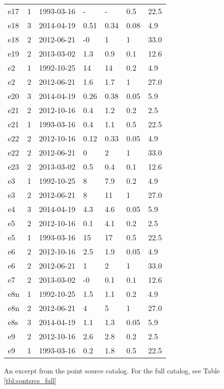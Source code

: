 \begin{table*}[htp]
\begin{tabular}{llll}
e17 & 1 & 1993-03-16 & - & - & 0.5 & 22.5 \\
e18 & 3 & 2014-04-19 & 0.51 & 0.34 & 0.08 & 4.9 \\
e18 & 2 & 2012-06-21 & -0 & 1 & 1 & 33.0 \\
e19 & 2 & 2013-03-02 & 1.3 & 0.9 & 0.1 & 12.6 \\
e2 & 1 & 1992-10-25 & 14 & 14 & 0.2 & 4.9 \\
e2 & 2 & 2012-06-21 & 1.6 & 1.7 & 1 & 27.0 \\
e20 & 3 & 2014-04-19 & 0.26 & 0.38 & 0.05 & 5.9 \\
e21 & 2 & 2012-10-16 & 0.4 & 1.2 & 0.2 & 2.5 \\
e21 & 1 & 1993-03-16 & 0.4 & 1.1 & 0.5 & 22.5 \\
e22 & 2 & 2012-10-16 & 0.12 & 0.33 & 0.05 & 4.9 \\
e22 & 2 & 2012-06-21 & 0 & 2 & 1 & 33.0 \\
e23 & 2 & 2013-03-02 & 0.5 & 0.4 & 0.1 & 12.6 \\
e3 & 1 & 1992-10-25 & 8 & 7.9 & 0.2 & 4.9 \\
e3 & 2 & 2012-06-21 & 8 & 11 & 1 & 27.0 \\
e4 & 3 & 2014-04-19 & 4.3 & 4.6 & 0.05 & 5.9 \\
e5 & 2 & 2012-10-16 & 0.1 & 4.1 & 0.2 & 2.5 \\
e5 & 1 & 1993-03-16 & 15 & 17 & 0.5 & 22.5 \\
e6 & 2 & 2012-10-16 & 2.5 & 1.9 & 0.05 & 4.9 \\
e6 & 2 & 2012-06-21 & 1 & 2 & 1 & 33.0 \\
e7 & 2 & 2013-03-02 & -0 & 0.1 & 0.1 & 12.6 \\
e8n & 1 & 1992-10-25 & 1.5 & 1.1 & 0.2 & 4.9 \\
e8n & 2 & 2012-06-21 & 4 & 5 & 1 & 27.0 \\
e8s & 3 & 2014-04-19 & 1.1 & 1.3 & 0.05 & 5.9 \\
e9 & 2 & 2012-10-16 & 2.6 & 2.8 & 0.2 & 2.5 \\
e9 & 1 & 1993-03-16 & 0.2 & 1.8 & 0.5 & 22.5 \\
\hline
\end{tabular}
\par
An excerpt from the point source catalog.  For the full catalog, see Table \ref{tbl:contsrcs_full} 
\end{table*}

